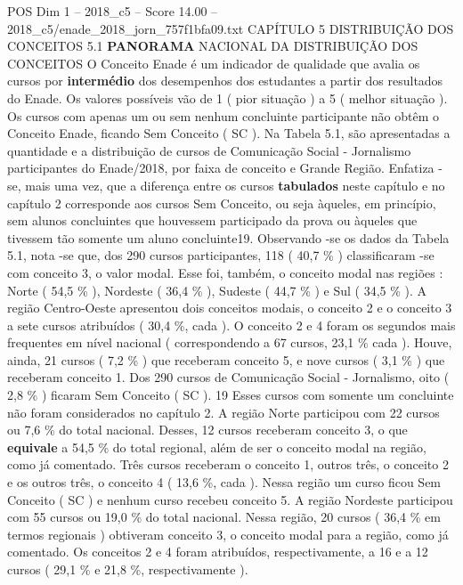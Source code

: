 \begin{textsample}{POS Dim 1 – 2018\_c5 – Score 14.00 – 2018\_c5/enade\_2018\_jorn\_757f1bfa09.txt}  \label{ex:f1_pos_069}
CAPÍTULO 5 DISTRIBUIÇÃO DOS CONCEITOS 5.1 \textbf{PANORAMA} NACIONAL DA DISTRIBUIÇÃO DOS CONCEITOS O Conceito Enade é um indicador de qualidade que avalia os cursos por \textbf{intermédio} dos desempenhos dos estudantes a partir dos resultados do Enade.
Os valores possíveis vão de 1 ( pior situação ) a 5 ( melhor situação ).
Os cursos com apenas um ou sem nenhum concluinte participante não obtêm o Conceito Enade, ficando Sem Conceito ( SC ).
Na Tabela 5.1, são apresentadas a quantidade e a distribuição de cursos de Comunicação Social - Jornalismo participantes do Enade/2018, por faixa de conceito e Grande Região.
Enfatiza -se, mais uma vez, que a diferença entre os cursos \textbf{tabulados} neste capítulo e no capítulo 2 corresponde aos cursos Sem Conceito, ou seja àqueles, em princípio, sem alunos concluintes que houvessem participado da prova ou àqueles que tivessem tão somente um aluno concluinte19.
Observando -se os dados da Tabela 5.1, nota -se que, dos 290 cursos participantes, 118 ( 40,7 \% ) classificaram -se com conceito 3, o valor modal.
Esse foi, também, o conceito modal nas regiões : Norte ( 54,5 \% ), Nordeste ( 36,4 \% ), Sudeste ( 44,7 \% ) e Sul ( 34,5 \% ).
A região Centro-Oeste apresentou dois conceitos modais, o conceito 2 e o conceito 3 a sete cursos atribuídos ( 30,4 \%, cada ).
O conceito 2 e 4 foram os segundos mais frequentes em nível nacional ( correspondendo a 67 cursos, 23,1 \% cada ).
Houve, ainda, 21 cursos ( 7,2 \% ) que receberam conceito 5, e nove cursos ( 3,1 \% ) que receberam conceito 1.
Dos 290 cursos de Comunicação Social - Jornalismo, oito ( 2,8 \% ) ficaram Sem Conceito ( SC ). 19 Esses cursos com somente um concluinte não foram considerados no capítulo 2.
A região Norte participou com 22 cursos ou 7,6 \% do total nacional.
Desses, 12 cursos receberam conceito 3, o que \textbf{equivale} a 54,5 \% do total regional, além de ser o conceito modal na região, como já comentado.
Três cursos receberam o conceito 1, outros três, o conceito 2 e os outros três, o conceito 4 ( 13,6 \%, cada ).
Nessa região um curso ficou Sem Conceito ( SC ) e nenhum curso recebeu conceito 5.
A região Nordeste participou com 55 cursos ou 19,0 \% do total nacional.
Nessa região, 20 cursos ( 36,4 \% em termos regionais ) obtiveram conceito 3, o conceito modal para a região, como já comentado.
Os conceitos 2 e 4 foram atribuídos, respectivamente, a 16 e a 12 cursos ( 29,1 \% e 21,8 \%, respectivamente ).

\end{textsample}
